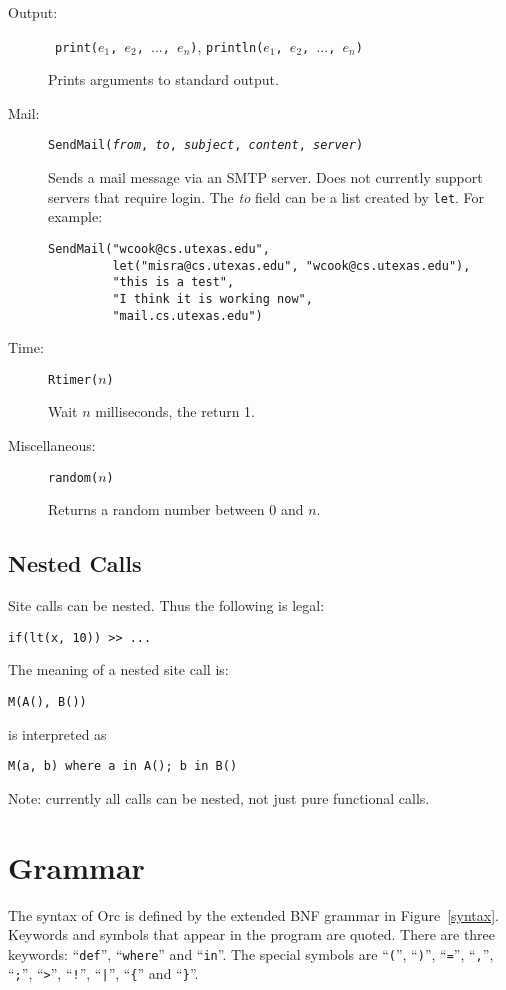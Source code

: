 \documentclass{article}
\newcommand{\B}[1]{``{\tt{#1}}''}
\newcommand{\Q}[1]{``{\tt{#1}}''}
\begin{document}
\begin{description}
\item[Output:]\ 
{\tt print($e_1$, $e_2$, $...$, $e_n$)},
{\tt println($e_1$, $e_2$, $...$, $e_n$)}

Prints arguments to standard output.

\item[Mail:]
{\tt SendMail({\it from}, {\it to}, {\it subject}, {\it content}, {\it server})}

Sends a mail message via an SMTP server. Does not currently support servers 
that require login. The {\it to} field can be a list created by {\tt let}.
For example:
\begin{verbatim}
SendMail("wcook@cs.utexas.edu", 
         let("misra@cs.utexas.edu", "wcook@cs.utexas.edu"),
         "this is a test", 
         "I think it is working now", 
         "mail.cs.utexas.edu")
\end{verbatim}
		 
\item[Time:]
{\tt Rtimer($n$)}

Wait $n$ milliseconds, the return 1.

\item[Miscellaneous:]
{\tt random($n$)}

Returns a random number between $0$ and $n$.

\end{description}

\subsection{Nested Calls}
Site calls can be nested. Thus the following is legal:

{\tt if(lt(x, 10)) >> ... }

The meaning of a nested site call is:

{\tt M(A(), B())}

is interpreted as 

{\tt M(a, b) where a in A(); b in B()}

Note: currently all calls can be nested, not just pure functional calls.

\section{Grammar}

The syntax of Orc is defined by the extended BNF grammar in Figure~\ref{syntax}.
Keywords and symbols that appear in the program are quoted. There
are three keywords: \B{def}, \B{where} and \B{in}. The special 
symbols are \Q{(}, \Q{)}, \Q{=}, \Q{,}, \Q{;}, \Q{>}, \Q{!}, \Q{|}, \Q{\{} and \Q{\}}.
\end{document}
